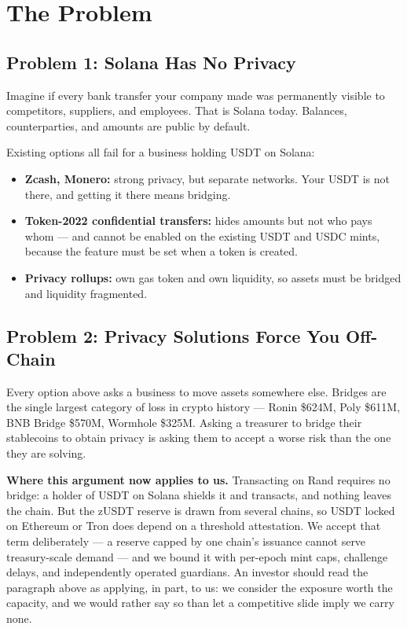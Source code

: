 \documentclass[11pt,a4paper]{article}
\begin{document}
\section{The Problem}

\subsection{Problem 1: Solana Has No Privacy}

Imagine if every bank transfer your company made was permanently visible to competitors, suppliers, and employees. That is Solana today. Balances, counterparties, and amounts are public by default.

Existing options all fail for a business holding USDT on Solana:

\begin{itemize}[leftmargin=*]
    \item \textbf{Zcash, Monero:} strong privacy, but separate networks. Your USDT is not there, and getting it there means bridging.
    \item \textbf{Token-2022 confidential transfers:} hides amounts but not who pays whom --- and cannot be enabled on the existing USDT and USDC mints, because the feature must be set when a token is created.
    \item \textbf{Privacy rollups:} own gas token and own liquidity, so assets must be bridged and liquidity fragmented.
\end{itemize}

\subsection{Problem 2: Privacy Solutions Force You Off-Chain}

Every option above asks a business to move assets somewhere else. Bridges are the single largest category of loss in crypto history --- Ronin \$624M, Poly \$611M, BNB Bridge \$570M, Wormhole \$325M. Asking a treasurer to bridge their stablecoins to obtain privacy is asking them to accept a worse risk than the one they are solving.

\textbf{Where this argument now applies to us.} Transacting on Rand requires no bridge: a holder of USDT on Solana shields it and transacts, and nothing leaves the chain. But the zUSDT reserve is drawn from several chains, so USDT locked on Ethereum or Tron does depend on a threshold attestation. We accept that term deliberately --- a reserve capped by one chain's issuance cannot serve treasury-scale demand --- and we bound it with per-epoch mint caps, challenge delays, and independently operated guardians. An investor should read the paragraph above as applying, in part, to us: we consider the exposure worth the capacity, and we would rather say so than let a competitive slide imply we carry none.
\end{document}
